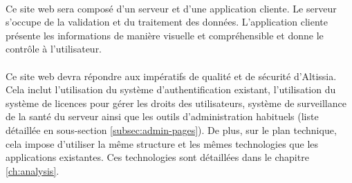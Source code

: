 \paragraph{}
Ce site web sera composé d'un serveur et d'une application cliente.
Le serveur s'occupe de la validation et du traitement des données.
L'application cliente présente les informations de manière visuelle et compréhensible et donne le contrôle à l'utilisateur.

\paragraph{}
Ce site web devra répondre aux impératifs de qualité et de sécurité d'Altissia.
Cela inclut l'utilisation du système d'authentification existant, l'utilisation du système de licences\fnmark{} pour gérer les droits des utilisateurs, système de surveillance de la santé du serveur ainsi que les outils d'administration habituels (liste détaillée en sous-section \ref{subsec:admin-pages}).
De plus, sur le plan technique, cela impose d'utiliser la même structure et les mêmes technologies que les applications existantes.
Ces technologies sont détaillées dans le chapitre \ref{ch:analysis}.

